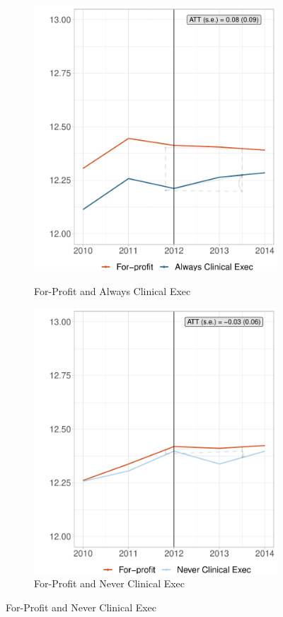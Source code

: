 \documentclass[12pt]{article}
\begin{document}
    \begin{figure}[ht!]
     \caption{Comparison to For-Profit: Mortality}
     \centering
     \begin{subfigure}[b]{0.45\textwidth}
         \centering
         \caption{For-Profit and Always Clinical Exec}
         \includegraphics[width=\textwidth]{Objects/fp_mort_md_synth_graph.pdf}
         \label{fig:mort_synth_plotb}
     \end{subfigure}%
     \hfill
     \begin{subfigure}[b]{0.45\textwidth}
         \centering
         \caption{For-Profit and Never Clinical Exec}
         \includegraphics[width=\textwidth]{Objects/fp_mort_nomd_synth_graph.pdf}

\end{subfigure}
\end{figure}
\end{document}
